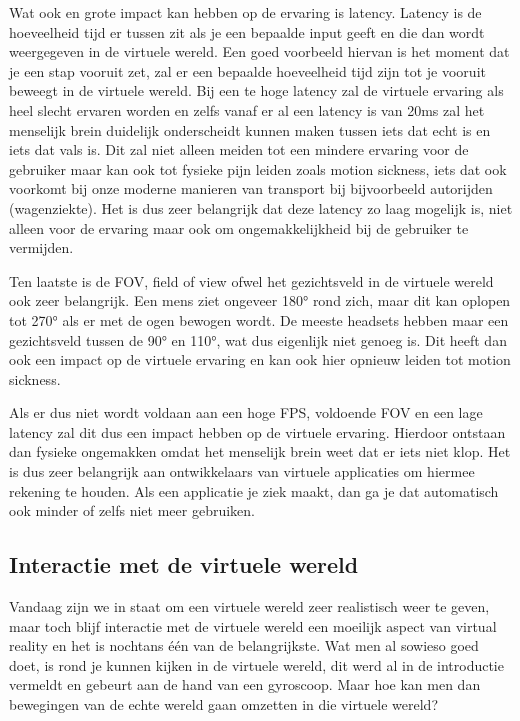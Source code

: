 Wat ook en grote impact kan hebben op de ervaring is latency. Latency is de hoeveelheid tijd er tussen zit als je een bepaalde input geeft en die dan wordt weergegeven in de virtuele wereld. Een goed voorbeeld hiervan is het moment dat je een stap vooruit zet, zal er een bepaalde hoeveelheid tijd zijn tot je vooruit beweegt in de virtuele wereld. Bij een te hoge latency zal de virtuele ervaring als heel slecht ervaren worden en zelfs vanaf er al een latency is van 20ms zal het menselijk brein duidelijk onderscheidt kunnen maken tussen iets dat echt is en iets dat vals is. Dit zal niet alleen meiden tot een mindere ervaring voor de gebruiker maar kan ook tot fysieke pijn leiden zoals motion sickness, iets dat ook voorkomt bij onze moderne manieren van transport bij bijvoorbeeld autorijden (wagenziekte). Het is dus zeer belangrijk dat deze latency zo laag mogelijk is, niet alleen voor de ervaring maar ook om ongemakkelijkheid bij de gebruiker te vermijden.

Ten laatste is de FOV, field of view ofwel het gezichtsveld in de virtuele wereld ook zeer belangrijk. Een mens ziet ongeveer 180° rond zich, maar dit kan oplopen tot 270° als er met de ogen bewogen wordt. De meeste headsets hebben maar een gezichtsveld tussen de 90° en 110°, wat dus eigenlijk niet genoeg is. Dit heeft dan ook een impact op de virtuele ervaring en kan ook hier opnieuw leiden tot motion sickness.

Als er dus niet wordt voldaan aan een hoge FPS, voldoende FOV en een lage latency zal dit dus een impact hebben op de virtuele ervaring. Hierdoor ontstaan dan fysieke ongemakken omdat het menselijk brein weet dat er iets niet klop. Het is dus zeer belangrijk aan ontwikkelaars van virtuele applicaties om hiermee rekening te houden. Als een applicatie je ziek maakt, dan ga je dat automatisch ook minder of zelfs niet meer gebruiken.

\subsection{Interactie met de virtuele wereld}
\label{subsec:interactie-vr}
Vandaag zijn we in staat om een virtuele wereld zeer realistisch weer te geven, maar toch blijf interactie met de virtuele wereld een moeilijk aspect van virtual reality en het is nochtans één van de belangrijkste. Wat men al sowieso goed doet, is rond je kunnen kijken in de virtuele wereld, dit werd al in de introductie vermeldt en gebeurt aan de hand van een gyroscoop. Maar hoe kan men dan bewegingen van de echte wereld gaan omzetten in die virtuele wereld?

